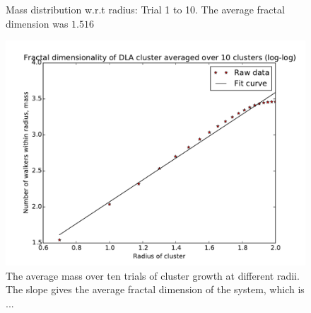 \documentclass[a4paper,12pt]{article}
\begin{document}
\begin{figure}[H]
\begin{tabular}{@{}cc@{}}
	\end{tabular}
	\caption{Mass distribution w.r.t radius: Trial 1 to 10. The average fractal dimension was $1.516$}
	\label{FractalDimension}
\end{figure}

\begin{figure}[H]
\begin{center}
\includegraphics[width = \textwidth]{pics/Fractal_dimension_final_avg.pdf}
\caption{The average mass over ten trials of cluster growth at different radii. The slope gives the average fractal dimension of the system, which is ...}
\label{AvgFractalDimension}
\end{center}
\end{figure}
\end{document}
